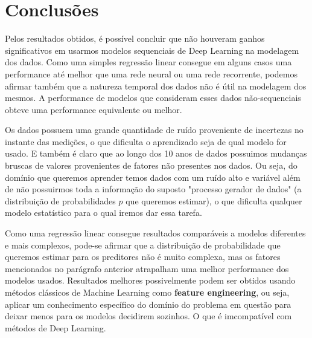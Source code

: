 \chapter{Conclusões}
\label{cap:conclusoes}


Pelos resultados obtidos, é possível concluir que não houveram ganhos
significativos em usarmos modelos sequenciais de Deep Learning na modelagem dos
dados. Como uma simples regressão linear consegue em alguns casos uma
performance até melhor que uma rede neural ou uma rede recorrente, podemos afirmar também que a natureza temporal dos dados não é útil na modelagem dos mesmos. A performance de modelos que consideram esses dados não-sequenciais obteve uma performance equivalente ou melhor.

Os dados possuem uma grande quantidade de ruído proveniente de incertezas no instante das medições, o que dificulta o aprendizado seja de qual modelo for usado. E também é claro que ao longo dos 10 anos de dados possuimos mudanças bruscas de valores provenientes de fatores não presentes nos dados. Ou seja, do domínio que queremos aprender temos dados com um ruído alto e variável além de não possuirmos toda a informação do suposto "processo gerador de dados" (a distribuição de probabilidades $p$ que queremos estimar), o que dificulta qualquer modelo estatístico para o qual iremos dar essa tarefa.

Como uma regressão linear consegue resultados comparáveis a modelos diferentes e mais complexos, pode-se afirmar que a distribuição de probabilidade que queremos estimar para os preditores não é muito complexa, mas os fatores mencionados no parágrafo anterior atrapalham uma melhor performance dos modelos usados. Resultados melhores possivelmente podem ser obtidos usando métodos clássicos de Machine Learning como \textbf{feature engineering}, ou seja, aplicar um conhecimento específico do domínio do problema em questão para deixar menos para os modelos decidirem sozinhos. O que é imcompatível com métodos de Deep Learning. 





